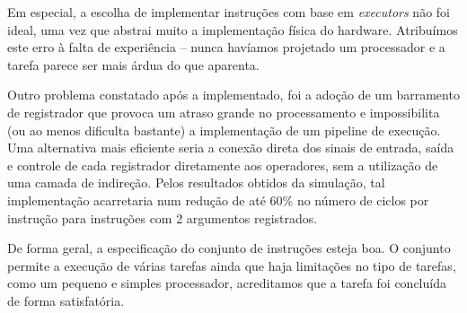\documentclass[11pt]{report}
\begin{document}
Em especial, a escolha de implementar instruções com base em \emph{executors} não foi ideal, uma vez que abstrai muito a implementação física do hardware. Atribuímos este erro à falta de experiência -- nunca havíamos projetado um processador e a tarefa parece ser mais árdua do que aparenta.

Outro problema constatado após a implementado, foi a adoção de um barramento de registrador que provoca um atraso grande no processamento e impossibilita (ou ao menos dificulta bastante) a implementação de um pipeline de execução. Uma alternativa mais eficiente seria a conexão direta dos sinais de entrada, saída e controle de cada registrador diretamente aos operadores, sem a utilização de uma camada de indireção. Pelos resultados obtidos da simulação, tal implementação acarretaria num redução de até 60\% no número de ciclos por instrução para instruções com 2 argumentos registrados.

De forma geral, a especificação do conjunto de instruções esteja boa. O conjunto permite a execução de várias tarefas ainda que haja limitações no tipo de tarefas, como um pequeno e simples processador, acreditamos que a tarefa foi concluída de forma satisfatória.
\end{document}
